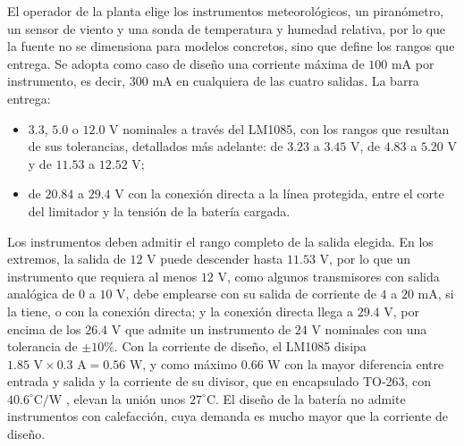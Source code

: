\documentclass[../../General.tex]{subfiles}
\begin{document}
El operador de la planta elige los instrumentos meteorológicos, un piranómetro, un sensor de viento y una sonda de temperatura y humedad relativa, por lo que la fuente no se dimensiona para modelos concretos, sino que define los rangos que entrega. Se adopta como caso de diseño una corriente máxima de $100\text{ mA}$ por instrumento, es decir, $300\text{ mA}$ en cualquiera de las cuatro salidas. La barra entrega:
\begin{itemize}
    \item $3.3$, $5.0$ o $12.0\text{ V}$ nominales a través del LM1085, con los rangos que resultan de sus tolerancias, detallados más adelante: de $3.23$ a $3.45\text{ V}$, de $4.83$ a $5.20\text{ V}$ y de $11.53$ a $12.52\text{ V}$;
    \item de $20.84$ a $29.4\text{ V}$ con la conexión directa a la línea protegida, entre el corte del limitador y la tensión de la batería cargada.
\end{itemize}
Los instrumentos deben admitir el rango completo de la salida elegida. En los extremos, la salida de $12\text{ V}$ puede descender hasta $11.53\text{ V}$, por lo que un instrumento que requiera al menos $12\text{ V}$, como algunos transmisores con salida analógica de $0$ a $10\text{ V}$, debe emplearse con su salida de corriente de $4$ a $20\text{ mA}$, si la tiene, o con la conexión directa; y la conexión directa llega a $29.4\text{ V}$, por encima de los $26.4\text{ V}$ que admite un instrumento de $24\text{ V}$ nominales con una tolerancia de $\pm 10\%$. Con la corriente de diseño, el LM1085 disipa $1.85\text{ V} \times 0.3\text{ A} = 0.56\text{ W}$, y como máximo $0.66\text{ W}$ con la mayor diferencia entre entrada y salida y la corriente de su divisor, que en encapsulado TO-263, con $40.6^\circ\text{C/W}$ \citep{ti_lm1085}, elevan la unión unos $27^\circ\text{C}$. El diseño de la batería no admite instrumentos con calefacción, cuya demanda es mucho mayor que la corriente de diseño.
\end{document}
